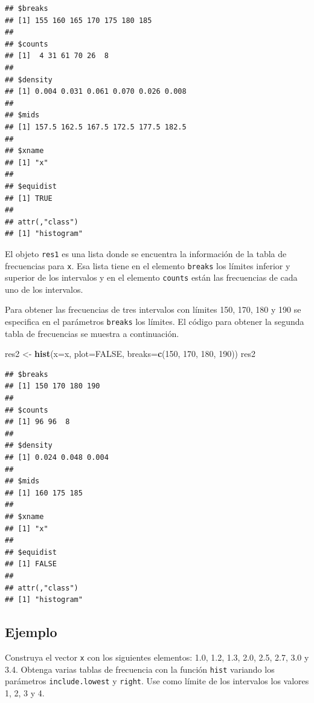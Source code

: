\documentclass[10pt,]{krantz}
\makeatletter
\newenvironment{Shaded}{\begin{snugshade}}{\end{snugshade}}
\newcommand{\KeywordTok}[1]{\textcolor[rgb]{0.13,0.29,0.53}{\textbf{{#1}}}}
\newcommand{\DataTypeTok}[1]{\textcolor[rgb]{0.13,0.29,0.53}{{#1}}}
\newcommand{\DecValTok}[1]{\textcolor[rgb]{0.00,0.00,0.81}{{#1}}}
\newcommand{\StringTok}[1]{\textcolor[rgb]{0.31,0.60,0.02}{{#1}}}
\newcommand{\OtherTok}[1]{\textcolor[rgb]{0.56,0.35,0.01}{{#1}}}
\newcommand{\NormalTok}[1]{{#1}}
\newenvironment{kframe}{%
\medskip{}
\setlength{\fboxsep}{.8em}
 \def\at@end@of@kframe{}%
 \ifinner\ifhmode%
  \def\at@end@of@kframe{\end{minipage}}%
  \begin{minipage}{\columnwidth}%
 \fi\fi%
 \def\FrameCommand##1{\hskip\@totalleftmargin \hskip-\fboxsep
 \colorbox{shadecolor}{##1}\hskip-\fboxsep
     \hskip-\linewidth \hskip-\@totalleftmargin \hskip\columnwidth}%
 \MakeFramed {\advance\hsize-\width
   \@totalleftmargin\z@ \linewidth\hsize
   \@setminipage}}%
 {\par\unskip\endMakeFramed%
 \at@end@of@kframe}
\renewenvironment{Shaded}{\begin{kframe}}{\end{kframe}}
\makeatother
\begin{document}
\begin{verbatim}
## $breaks
## [1] 155 160 165 170 175 180 185
## 
## $counts
## [1]  4 31 61 70 26  8
## 
## $density
## [1] 0.004 0.031 0.061 0.070 0.026 0.008
## 
## $mids
## [1] 157.5 162.5 167.5 172.5 177.5 182.5
## 
## $xname
## [1] "x"
## 
## $equidist
## [1] TRUE
## 
## attr(,"class")
## [1] "histogram"
\end{verbatim}

El objeto \texttt{res1} es una lista donde se encuentra la información
de la tabla de frecuencias para \texttt{x}. Esa lista tiene en el
elemento \texttt{breaks} los límites inferior y superior de los
intervalos y en el elemento \texttt{counts} están las frecuencias de
cada uno de los intervalos.

Para obtener las frecuencias de tres intervalos con límites 150, 170,
180 y 190 se especifica en el parámetros \texttt{breaks} los límites. El
código para obtener la segunda tabla de frecuencias se muestra a
continuación.

\begin{Shaded}
\begin{Highlighting}[]
\NormalTok{res2 <-}\StringTok{ }\KeywordTok{hist}\NormalTok{(}\DataTypeTok{x=}\NormalTok{x, }\DataTypeTok{plot=}\OtherTok{FALSE}\NormalTok{, }
             \DataTypeTok{breaks=}\KeywordTok{c}\NormalTok{(}\DecValTok{150}\NormalTok{, }\DecValTok{170}\NormalTok{, }\DecValTok{180}\NormalTok{, }\DecValTok{190}\NormalTok{))}
\NormalTok{res2}
\end{Highlighting}
\end{Shaded}

\begin{verbatim}
## $breaks
## [1] 150 170 180 190
## 
## $counts
## [1] 96 96  8
## 
## $density
## [1] 0.024 0.048 0.004
## 
## $mids
## [1] 160 175 185
## 
## $xname
## [1] "x"
## 
## $equidist
## [1] FALSE
## 
## attr(,"class")
## [1] "histogram"
\end{verbatim}

\subsection*{Ejemplo}\label{ejemplo-29}


Construya el vector \texttt{x} con los siguientes elementos: 1.0, 1.2,
1.3, 2.0, 2.5, 2.7, 3.0 y 3.4. Obtenga varias tablas de frecuencia con
la función \texttt{hist} variando los parámetros \texttt{include.lowest}
y \texttt{right}. Use como límite de los intervalos los valores 1, 2, 3
y 4.
\end{document}
